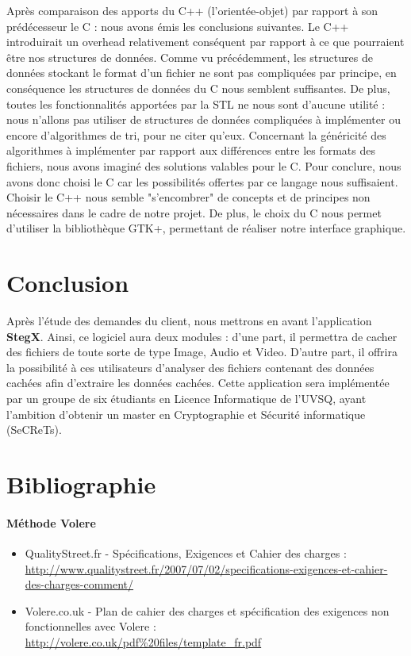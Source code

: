 \documentclass[11pt]{article}
\begin{document}
Après comparaison des apports du C++ (l’orientée-objet) par rapport à son 
prédécesseur le C : nous avons émis les conclusions suivantes. Le C++ introduirait 
un overhead relativement conséquent par rapport à ce que pourraient être nos 
structures de données. Comme vu précédemment, les structures de données 
stockant le format d’un fichier ne sont pas compliquées par principe, en 
conséquence les structures de données du C nous semblent suffisantes. 
De plus, toutes les fonctionnalités apportées par la STL ne nous sont 
d’aucune utilité : nous n’allons pas utiliser de structures de données 
compliquées à implémenter ou encore d’algorithmes de tri, pour ne citer 
qu’eux. Concernant la généricité des algorithmes à implémenter par rapport 
aux différences entre les formats des fichiers, nous avons imaginé des 
solutions valables pour le C.
Pour conclure, nous avons donc choisi le C car les possibilités offertes 
par ce langage nous suffisaient. Choisir le C++ nous semble "s’encombrer" 
de concepts et de principes non nécessaires dans le cadre de notre projet. 
De plus, le choix du C nous permet d’utiliser la bibliothèque GTK+, 
permettant de réaliser notre interface graphique.
\small

\section{Conclusion}

Après l'étude des demandes du client, nous mettrons en avant l'application
\textbf{StegX}. 
Ainsi, ce logiciel aura deux modules : d'une part, il permettra de cacher 
des fichiers de toute sorte de type Image, Audio et Video. 
D'autre part, il offrira la possibilité à ces utilisateurs d'analyser des 
fichiers contenant des données cachées afin d'extraire les données cachées. \newline
Cette application sera implémentée par un groupe de six
étudiants en Licence Informatique de l'UVSQ, ayant l'ambition d'obtenir un master en
Cryptographie et Sécurité informatique (SeCReTs). 

\newpage

\section{Bibliographie}

\paragraph{Méthode Volere}
\begin{itemize}
\item QualityStreet.fr - Spécifications, Exigences et Cahier des charges : \\
    \url{http://www.qualitystreet.fr/2007/07/02/specifications-exigences-et-cahier-des-charges-comment/}
\item Volere.co.uk - Plan de cahier des charges et spécification des exigences
    non fonctionnelles avec Volere : \\
    \url{http://volere.co.uk/pdf%20files/template_fr.pdf}
\end{itemize}
\end{document}
